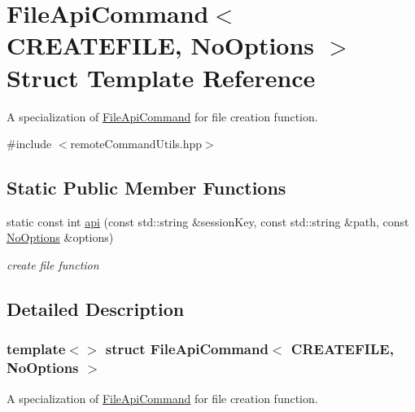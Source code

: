 \hypertarget{structFileApiCommand_3_01CREATEFILE_00_01NoOptions_01_4}{
\section{FileApiCommand$<$ CREATEFILE, NoOptions $>$ Struct Template Reference}
\label{structFileApiCommand_3_01CREATEFILE_00_01NoOptions_01_4}
}


A specialization of \hyperlink{structFileApiCommand}{FileApiCommand} for file creation function.  




{\ttfamily \#include $<$remoteCommandUtils.hpp$>$}

\subsection*{Static Public Member Functions}
\begin{DoxyCompactItemize}
\item 
static const int \hyperlink{structFileApiCommand_3_01CREATEFILE_00_01NoOptions_01_4_a1aba0894b59d1a619b2f759d4eb9e0c2}{api} (const std::string \&sessionKey, const std::string \&path, const \hyperlink{structNoOptions}{NoOptions} \&options)
\begin{DoxyCompactList}\small\item\em create file function \item\end{DoxyCompactList}\end{DoxyCompactItemize}


\subsection{Detailed Description}
\subsubsection*{template$<$$>$ struct FileApiCommand$<$ CREATEFILE, NoOptions $>$}

A specialization of \hyperlink{structFileApiCommand}{FileApiCommand} for file creation function. 

